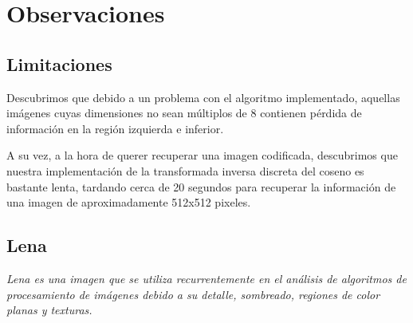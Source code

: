 \documentclass[spanish]{scrartcl}
\begin{document}
\begin{figure}[!htbp]
    \label{fig:all_img2}
\end{figure}

\section{Observaciones}

\subsection{Limitaciones}
Descubrimos que debido a un problema con el algoritmo implementado, aquellas imágenes cuyas dimensiones no sean múltiplos de 8 contienen pérdida de información en la región izquierda e inferior.

A su vez, a la hora de querer recuperar una imagen codificada, descubrimos que nuestra implementación de la transformada inversa discreta del coseno es bastante lenta, tardando cerca de 20 segundos para recuperar la información de una imagen de aproximadamente 512x512 pixeles. 

\subsection{Lena}
\em{Lena} es una imagen que se utiliza recurrentemente en el análisis de algoritmos de procesamiento de imágenes\cite{wikipedia_Lena} debido a su detalle, sombreado, regiones de color planas y texturas.
\end{document}
